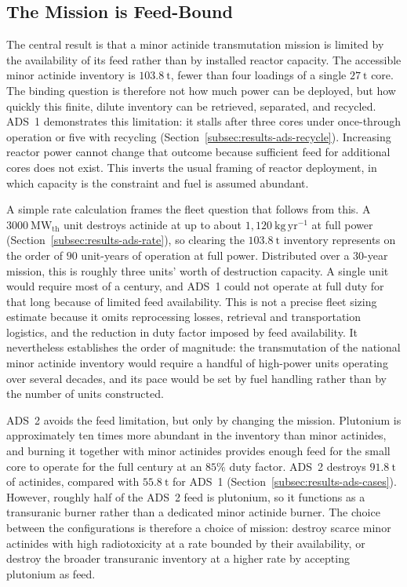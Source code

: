 \subsection{The Mission is Feed-Bound}
\label{subsec:discussion-feedbound}

The central result is that a minor actinide transmutation mission is limited by
the availability of its feed rather than by installed reactor capacity. The
accessible minor actinide inventory is \(103.8~\mathrm{t}\), fewer than four
loadings of a single \(27~\mathrm{t}\) core. The binding question is therefore
not how much power can be deployed, but how quickly this finite, dilute inventory
can be retrieved, separated, and recycled. ADS~1 demonstrates this limitation: it
stalls after three cores under once-through operation or five with recycling
(Section~\ref{subsec:results-ads-recycle}). Increasing reactor power cannot
change that outcome because sufficient feed for additional cores does not exist.
This inverts the usual framing of reactor deployment, in which capacity is the
constraint and fuel is assumed abundant.

A simple rate calculation frames the fleet question that follows from this. A
\(3000~\mathrm{MW_{th}}\) unit destroys actinide at up to about
\(1{,}120~\mathrm{kg\,yr^{-1}}\) at full power
(Section~\ref{subsec:results-ads-rate}), so clearing the \(103.8~\mathrm{t}\)
inventory represents on the order of \(90\) unit-years of operation at full
power. Distributed over a 30-year mission, this is roughly three units' worth of
destruction capacity. A single unit would require most of a century, and ADS~1
could not operate at full duty for that long because of limited feed availability.
This is not a precise fleet sizing estimate because it omits reprocessing losses,
retrieval and transportation logistics, and the reduction in duty factor imposed
by feed availability. It nevertheless establishes the order of magnitude: the
transmutation of the national minor actinide inventory would require a handful of
high-power units operating over several decades, and its pace would be set by fuel
handling rather than by the number of units constructed.

ADS~2 avoids the feed limitation, but only by changing the mission. Plutonium
is approximately ten times more abundant in the inventory than minor actinides,
and burning it together with minor actinides provides enough feed for the small
core to operate for the full century at an \(85\%\) duty factor. ADS~2 destroys
\(91.8~\mathrm{t}\) of actinides, compared with \(55.8~\mathrm{t}\) for ADS~1
(Section~\ref{subsec:results-ads-cases}). However, roughly half of the ADS~2 feed
is plutonium, so it functions as a transuranic burner rather than a dedicated
minor actinide burner. The choice between the configurations is therefore a
choice of mission: destroy scarce minor actinides with high radiotoxicity at a
rate bounded by their availability, or destroy the broader transuranic inventory
at a higher rate by accepting plutonium as feed.

